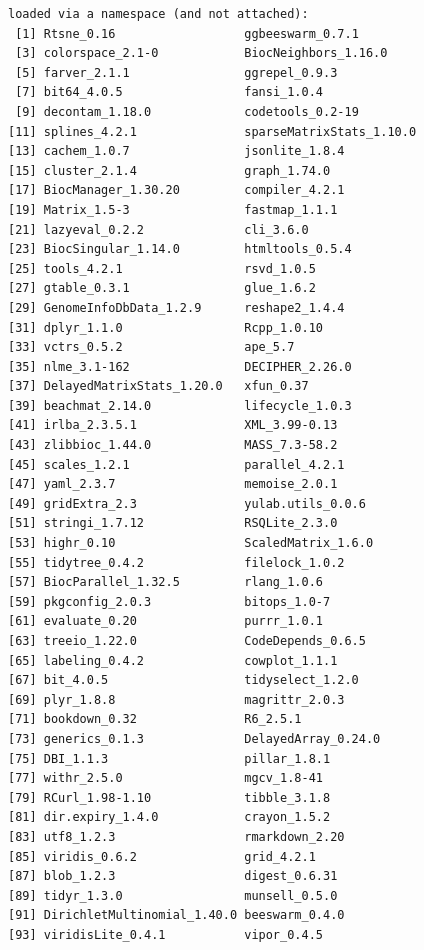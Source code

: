 \documentclass[
]{book}
\begin{document}
\begin{verbatim}
loaded via a namespace (and not attached):
 [1] Rtsne_0.16                  ggbeeswarm_0.7.1           
 [3] colorspace_2.1-0            BiocNeighbors_1.16.0       
 [5] farver_2.1.1                ggrepel_0.9.3              
 [7] bit64_4.0.5                 fansi_1.0.4                
 [9] decontam_1.18.0             codetools_0.2-19           
[11] splines_4.2.1               sparseMatrixStats_1.10.0   
[13] cachem_1.0.7                jsonlite_1.8.4             
[15] cluster_2.1.4               graph_1.74.0               
[17] BiocManager_1.30.20         compiler_4.2.1             
[19] Matrix_1.5-3                fastmap_1.1.1              
[21] lazyeval_0.2.2              cli_3.6.0                  
[23] BiocSingular_1.14.0         htmltools_0.5.4            
[25] tools_4.2.1                 rsvd_1.0.5                 
[27] gtable_0.3.1                glue_1.6.2                 
[29] GenomeInfoDbData_1.2.9      reshape2_1.4.4             
[31] dplyr_1.1.0                 Rcpp_1.0.10                
[33] vctrs_0.5.2                 ape_5.7                    
[35] nlme_3.1-162                DECIPHER_2.26.0            
[37] DelayedMatrixStats_1.20.0   xfun_0.37                  
[39] beachmat_2.14.0             lifecycle_1.0.3            
[41] irlba_2.3.5.1               XML_3.99-0.13              
[43] zlibbioc_1.44.0             MASS_7.3-58.2              
[45] scales_1.2.1                parallel_4.2.1             
[47] yaml_2.3.7                  memoise_2.0.1              
[49] gridExtra_2.3               yulab.utils_0.0.6          
[51] stringi_1.7.12              RSQLite_2.3.0              
[53] highr_0.10                  ScaledMatrix_1.6.0         
[55] tidytree_0.4.2              filelock_1.0.2             
[57] BiocParallel_1.32.5         rlang_1.0.6                
[59] pkgconfig_2.0.3             bitops_1.0-7               
[61] evaluate_0.20               purrr_1.0.1                
[63] treeio_1.22.0               CodeDepends_0.6.5          
[65] labeling_0.4.2              cowplot_1.1.1              
[67] bit_4.0.5                   tidyselect_1.2.0           
[69] plyr_1.8.8                  magrittr_2.0.3             
[71] bookdown_0.32               R6_2.5.1                   
[73] generics_0.1.3              DelayedArray_0.24.0        
[75] DBI_1.1.3                   pillar_1.8.1               
[77] withr_2.5.0                 mgcv_1.8-41                
[79] RCurl_1.98-1.10             tibble_3.1.8               
[81] dir.expiry_1.4.0            crayon_1.5.2               
[83] utf8_1.2.3                  rmarkdown_2.20             
[85] viridis_0.6.2               grid_4.2.1                 
[87] blob_1.2.3                  digest_0.6.31              
[89] tidyr_1.3.0                 munsell_0.5.0              
[91] DirichletMultinomial_1.40.0 beeswarm_0.4.0             
[93] viridisLite_0.4.1           vipor_0.4.5                
\end{verbatim}
\end{document}
